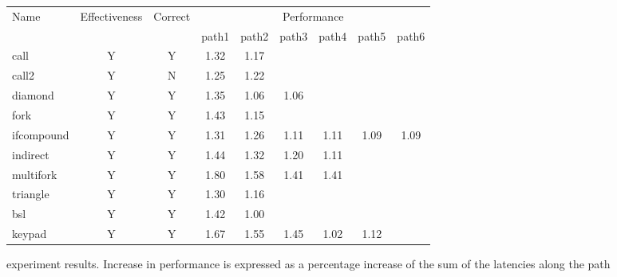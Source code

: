 \begin{figure}
    \centering
    \begin{tabular}{ l | c | c | c c c c c c }
    Name & Effectiveness & Correct & \multicolumn{6}{c}{Performance} \\ 
     & & & path1 & path2 & path3 & path4 & path5 & path6\\
     \hline 

    call        & Y & Y & 1.32 & 1.17 & &  & & \\  
    call2       & Y & N & 1.25 & 1.22 & &  & & \\
    diamond     & Y & Y & 1.35 & 1.06 & 1.06 & & &  \\ 
    fork        & Y & Y & 1.43 & 1.15 & & & &  \\  
    ifcompound  & Y & Y & 1.31 & 1.26 & 1.11 & 1.11 & 1.09 & 1.09  \\
    indirect    & Y & Y & 1.44 & 1.32 & 1.20 & 1.11 & & \\ 

    multifork   & Y & Y & 1.80 & 1.58 & 1.41 & 1.41 & &   \\
    triangle    & Y & Y & 1.30 & 1.16 & & & &  \\
  	\hline
  	bsl         & Y & Y & 1.42 & 1.00 & & & &  \\ 
	keypad      & Y & Y & 1.67 & 1.55 & 1.45 & 1.02 & 1.12 &   \\  
    \end{tabular}
    \caption{experiment results. Increase in performance is expressed as a percentage increase of the sum of the latencies along the path}
    \label{fig:experiment results}
\end{figure}
